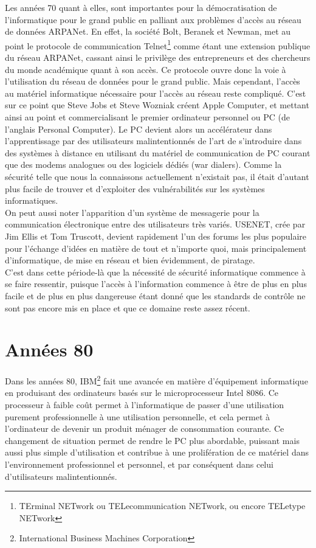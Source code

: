 \documentclass[a4paper]{memoir}
\begin{document}
Les années 70 quant à elles, sont importantes pour la démocratisation de l'informatique pour le grand public en palliant aux problèmes d'accès au réseau de données ARPANet. En effet, la société Bolt, Beranek et Newman, met au point le protocole de communication Telnet\footnote{TErminal NETwork ou TELecommunication NETwork, ou encore TELetype NETwork} comme étant une extension publique du réseau ARPANet, cassant ainsi le privilège des entrepreneurs et des chercheurs du monde académique quant à son accès. Ce protocole ouvre donc la voie à l'utilisation du réseau de données pour le grand public. Mais cependant, l'accès au matériel informatique nécessaire pour l'accès au réseau reste compliqué. C'est sur ce point que Steve Jobs et Steve Wozniak créent Apple Computer, et mettant ainsi au point et commercialisant le premier ordinateur personnel ou PC (de l'anglais Personal Computer). Le PC devient alors un accélérateur dans l'apprentissage par des utilisateurs malintentionnés de l'art de s'introduire dans des systèmes à distance en utilisant du matériel de communication de PC courant que des modems analogues ou des logiciels dédiés (war dialers). Comme la sécurité telle que nous la connaissons actuellement n'existait pas, il était d'autant plus facile de trouver et d'exploiter des vulnérabilités sur les systèmes informatiques.\\
\noindent On peut aussi noter l'apparition d'un système de messagerie pour la communication électronique entre des utilisateurs très variés. USENET, crée par Jim Ellis et Tom Truscott, devient rapidement l'un des forums les plus populaire pour l'échange d'idées en matière de tout et n'importe quoi, mais principalement d'informatique, de mise en réseau et bien évidemment, de piratage.\\
C'est dans cette période-là que la nécessité de sécurité informatique commence à se faire ressentir, puisque l'accès à l'information commence à être de plus en plus facile et de plus en plus dangereuse étant donné que les standards de contrôle ne sont pas encore mis en place et que ce domaine reste assez récent.


\section{Années 80}

Dans les années 80, IBM\footnote{International Business Machines Corporation} fait une avancée en matière d'équipement informatique en produisant des ordinateurs basés sur le microprocesseur Intel 8086. Ce processeur à faible coût permet à l'informatique de passer d'une utilisation purement professionnelle à une utilisation personnelle, et cela permet à l'ordinateur de devenir un produit ménager de consommation courante. Ce changement de situation permet de rendre le PC plus abordable, puissant mais aussi plus simple d'utilisation et contribue à une prolifération de ce matériel dans l'environnement professionnel et personnel, et par conséquent dans celui d'utilisateurs malintentionnés.
\end{document}
